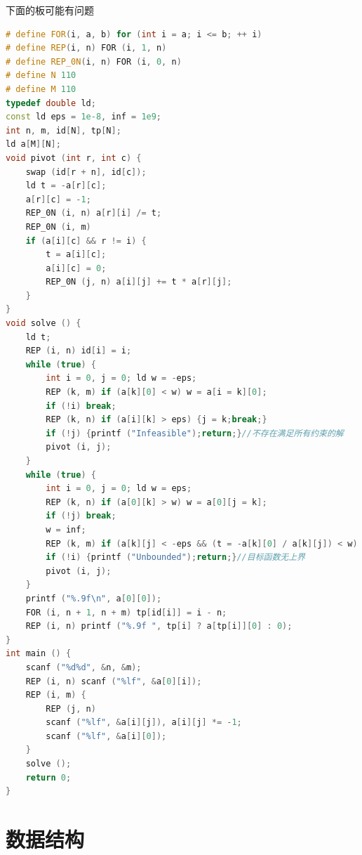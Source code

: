 \documentclass[UTF8,a4paper,titlepage]{ctexart}
\begin{document}
下面的板可能有问题
\begin{lstlisting}[language=C++]
# define FOR(i, a, b) for (int i = a; i <= b; ++ i)
# define REP(i, n) FOR (i, 1, n)
# define REP_0N(i, n) FOR (i, 0, n)
# define N 110
# define M 110
typedef double ld;
const ld eps = 1e-8, inf = 1e9;
int n, m, id[N], tp[N];
ld a[M][N];
void pivot (int r, int c) {
    swap (id[r + n], id[c]);
    ld t = -a[r][c];
    a[r][c] = -1;
    REP_0N (i, n) a[r][i] /= t;
    REP_0N (i, m)
    if (a[i][c] && r != i) {
        t = a[i][c];
        a[i][c] = 0;
        REP_0N (j, n) a[i][j] += t * a[r][j];
    }
}
void solve () {
    ld t;
    REP (i, n) id[i] = i;
    while (true) {
        int i = 0, j = 0; ld w = -eps;
        REP (k, m) if (a[k][0] < w) w = a[i = k][0];
        if (!i) break;
        REP (k, n) if (a[i][k] > eps) {j = k;break;}
        if (!j) {printf ("Infeasible");return;}//不存在满足所有约束的解
        pivot (i, j);
    }
    while (true) {
        int i = 0, j = 0; ld w = eps;
        REP (k, n) if (a[0][k] > w) w = a[0][j = k];
        if (!j) break;
        w = inf;
        REP (k, m) if (a[k][j] < -eps && (t = -a[k][0] / a[k][j]) < w) w = t, i = k;
        if (!i) {printf ("Unbounded");return;}//目标函数无上界
        pivot (i, j);
    }
    printf ("%.9f\n", a[0][0]);
    FOR (i, n + 1, n + m) tp[id[i]] = i - n;
    REP (i, n) printf ("%.9f ", tp[i] ? a[tp[i]][0] : 0);
}
int main () {
    scanf ("%d%d", &n, &m);
    REP (i, n) scanf ("%lf", &a[0][i]);
    REP (i, m) {
        REP (j, n)
        scanf ("%lf", &a[i][j]), a[i][j] *= -1;
        scanf ("%lf", &a[i][0]);
    }
    solve ();
    return 0;
}

\end{lstlisting}   

\section{数据结构}
\end{document}
